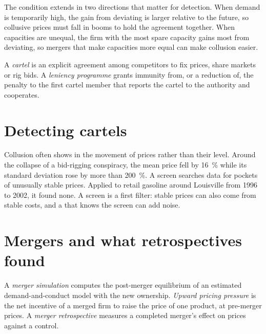 The condition extends in two directions that matter for detection. When demand is
temporarily high, the gain from deviating is larger relative to the future, so
collusive prices must fall in booms to hold the agreement together. When capacities
are unequal, the firm with the most spare capacity gains most from deviating, so
mergers that make capacities more equal can make collusion easier.

\begin{definition}\label{def:b3:oligopoly-and-collusion:cartel}
A \emph{cartel} is an explicit agreement among competitors to fix prices, share
markets or rig bids. A \emph{leniency programme} grants immunity from, or a reduction
of, the penalty to the first cartel member that reports the cartel to the authority
and cooperates.
\end{definition}

\section{Detecting cartels}\label{sec:b3:oligopoly-and-collusion:detection}

\begin{measure}
Collusion often shows in the movement of prices rather than their level. Around the
collapse of a bid-rigging conspiracy, the mean price fell by 16~\% while its standard
deviation rose by more than 200~\%. %
A screen searches data for pockets of unusually stable prices. Applied to retail
gasoline around Louisville from 1996 to 2002, it found none. A screen is a first
filter: stable prices can also come from stable costs, and a  that knows the
screen can add noise.
\end{measure}

\section{Mergers and what retrospectives found}\label{sec:b3:oligopoly-and-collusion:mergers}

\begin{definition}\label{def:b3:oligopoly-and-collusion:mergers}
A \emph{merger simulation} computes the post-merger equilibrium of an estimated
demand-and-conduct model with the new ownership. \emph{Upward pricing pressure} is
the net incentive of a merged firm to raise the price of one product, at pre-merger
prices. A \emph{merger retrospective} measures a completed merger's effect on prices
against a control.
\end{definition}

